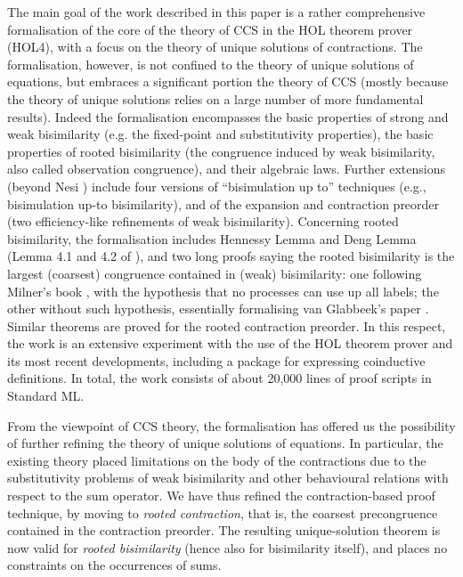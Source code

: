 The main goal of the work described in this paper is a rather
comprehensive formalisation of the core of the theory of CCS in the HOL
theorem prover (HOL4),  with a focus on the theory of unique solutions of contractions.
The formalisation, however, is not confined to the theory of unique
solutions of equations, but embraces a significant portion the theory of CCS \cite{Mil89}
(mostly because the theory of unique solutions relies on a large number of more fundamental results).
Indeed the formalisation encompasses the basic properties of strong and weak
bisimilarity (e.g. the fixed-point and substitutivity properties), the
basic properties of
rooted bisimilarity (the congruence induced by weak
bisimilarity, also called observation congruence), and
their algebraic laws. Further extensions (beyond Nesi
\cite{Nesi:1992ve}) include four versions of ``bisimulation up to''
techniques (e.g., bisimulation up-to bisimilarity), and of the
expansion and contraction preorder (two
efficiency-like refinements of weak bisimilarity). Concerning rooted bisimilarity, the formalisation
includes Hennessy Lemma and Deng Lemma (Lemma 4.1 and 4.2 of
\cite{Gorrieri:2015jt}),
 and two long proofs saying the rooted bisimilarity is the largest (coarsest)
 congruence contained in (weak) bisimilarity: one following Milner's
 book \cite{Mil89}, with the hypothesis that no processes can use up
 all labels;
the other without such hypothesis, essentially formalising van Glabbeek's paper \cite{vanGlabbeek:2005ur}.
Similar theorems are proved for the rooted contraction preorder.
In this respect, the work is an extensive experiment with the use of the HOL theorem prover and its
most recent developments, including a package for expressing coinductive definitions.
In total, the work consists of about 20,000 lines of proof scripts in Standard ML.

From the viewpoint of CCS theory, the formalisation has offered us the possibility of 
further refining the theory of unique solutions of equations.
In particular, the existing theory placed limitations on the body of the contractions due to the
substitutivity problems of weak bisimilarity and other behavioural relations with respect
to the sum operator.
We have thus refined the contraction-based proof technique, by moving to  
\emph{rooted contraction}, that is, the coarsest precongruence contained in the contraction
preorder. The resulting unique-solution theorem is now valid for
\emph{rooted bisimilarity} (hence also for bisimilarity itself), and places no 
constraints on the occurrences of sums.

